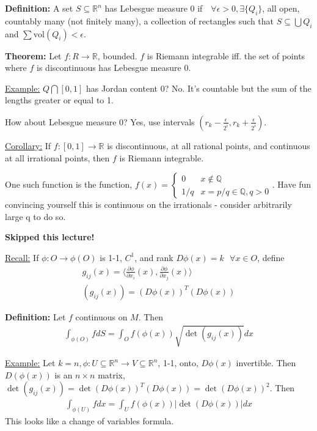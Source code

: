 \documentclass{article}
\newcommand*{\txt}[1]{\text{ #1 }}%
\newcommand*{\iprod}[1]{\langle #1 \rangle}
\newcommand*{\fora}{\txt{}\forall}%
\newcommand*{\rr}{\mathbb{R}}%
\newcommand*{\partials}[2]{\frac{\partial #1}{\partial #2}}%
\begin{document}
\textbf{Definition:} A set $S\subseteq \rr^n$ has Lebesgue measure 0 if $\fora \epsilon>0, \exists \{Q_i\}$, all open, countably many (not finitely many), a collection of rectangles such that $S\subseteq \bigcup Q_i$ and $\sum \text{vol}(Q_i)<\epsilon$.

\textbf{Theorem:} Let $f:R\to \rr$, bounded. $f$ is Riemann integrable iff. the set of points where $f$ is discontinuous has Lebesgue measure 0.

\underline{Example:} $Q\bigcap [0,1]$ has Jordan content 0? No. It's countable but the sum of the lengths greater or equal to 1. 

How about Lebesgue measure 0? Yes, use intervals $(r_k-\frac{\epsilon}{2^i},r_k+\frac{\epsilon}{2^i})$.

\underline{Corollary:} If $f:[0,1]\to \rr$ is discontinuous, at all rational points, and continuous at all irrational points, then $f$ is Riemann integrable.

One such function is the function, $f(x)=\begin{cases}
    0 & x\notin \mathbb{Q}\\
    1/q & x=p/q \in \mathbb{Q}, q>0
\end{cases}$. Have fun convincing yourself this is continuous on the irrationals - consider arbitrarily large q to do so.

\textbf{Skipped this lecture!}

\underline{Recall:} If $\phi: O\to \phi(O)$ is 1-1, $C^1$, and rank $D\phi(x)=k\fora x\in O$, define \begin{align*}
    g_{ij}(x)=\iprod{\partials{\phi}{x_i}(x),\partials{\phi}{x_j}(x)}\\
    (g_{ij}(x))=(D\phi(x))^T(D\phi(x))
\end{align*}

\textbf{Definition:} Let $f$ continuous on $M$. Then \begin{align*}
    \int_{\phi(O)}f dS = \int_O f(\phi(x))\sqrt{\det(g_{ij}(x))}dx
\end{align*}

\underline{Example:} Let $k=n, \phi:U\subseteq\rr^n\to V\subseteq \rr^n$, 1-1, onto, $D\phi(x)$ invertible. Then $D(\phi(x))$ is an $n\times n$ matrix, $\det(g_{ij}(x))=\det(D\phi(x))^T(D\phi(x))=\det(D\phi(x))^2$. Then \begin{align*}
    \int_{\phi(U)}f dx = \int_U f(\phi(x))|\det(D\phi(x))|dx
\end{align*} This looks like a change of variables formula.
\end{document}
